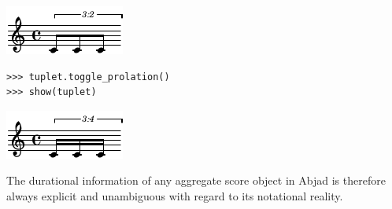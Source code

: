 \includegraphics[scale=1.0]{images/section_2_notational_isomorphism-4.pdf}

\begin{lstlisting}
>>> tuplet.toggle_prolation()
>>> show(tuplet)
\end{lstlisting}

\includegraphics[scale=1.0]{images/section_2_notational_isomorphism-5.pdf}


The durational information of any aggregate score object in Abjad is therefore
always explicit and unambiguous with regard to its notational reality.